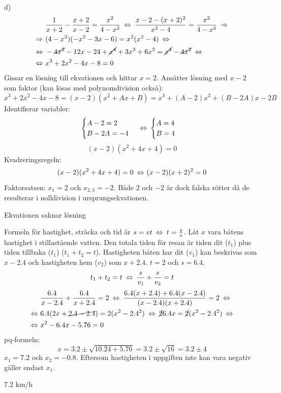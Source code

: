 \begin{task}{d)}
	\begin{align*}
	&\dfrac{1}{x+2}-\dfrac{x+2}{x-2}=\dfrac{x^2}{4-x^2}\lra
	\dfrac{x-2-(x+2)^2}{x^2-4}=\dfrac{x^2}{4-x^2} \ra \\ \ra
	&(4-x^2)(-x^2-3x-6)=x^2(x^2-4) \lra \\ \lra
	&-\cancel{4x^2}-12x-24+\cancel{x^4}+3x^3+6x^2=\cancel{x^4}-\cancel{4x^2} \lra \\ \lra
	&x^3+2x^2-4x-8=0
	\end{align*}
	Gissar en lösning till ekvationen och hittar $x=2$. Ansätter lösning med $x-2$ som faktor (kan lösas med polynomdivision också):
	\[x^3+2x^2-4x-8=(x-2)(x^2+Ax+B)=x^3+(A-2)x^2+(B-2A)x-2B\]
	Identifierar variabler:
	\[\begin{cases}
	A-2=2 \\
	B-2A=-4
	\end{cases}
	\lra
	\begin{cases}
	A=4 \\
	B=4
	\end{cases}\]
	\[(x-2)(x^2+4x+4)=0\]
	Kvadreringsregeln:
	\[(x-2)(x^2+4x+4)=0\lra
	(x-2)(x+2)^2=0\]
	Faktorsatsen: $x_1=2$ och $x_{2,3}=-2$.
	Både $2$ och $-2$ är dock falska rötter då de resulterar i nolldivision i ursprungsekvationen.
	
	\ans Ekvationen saknar lösning
\end{task}

\begin{task}{3.6}
	Formeln för hastighet, sträcka och tid är $s=v\*t \lra t=\frac{s}{v}$. Låt $x$ vara båtens hastighet i stillastående vatten. Den totala tiden för resan är tiden dit ($t_1$) plus tiden tillbaka ($t_1$) ($t_1+t_2=t$).
	Hastigheten båten har dit ($v_1$) kan beskrivas som $x-2.4$ och hastigheten hem ($v_2$) som $x+2.4$. $t=2$ och $s=6.4$.
	\[t_1+t_2=t\lra
	\frac{s}{v_1}+\frac{s}{v_2}=t\]
	\begin{align*}
	&\frac{6.4}{x-2.4}+\frac{6.4}{x+2.4} = 2 \lra
	\frac{6.4(x+2.4)+6.4(x-2.4)}{(x-2.4)(x+2.4)} = 2 \lra \\ \lra
	&6.4(2x+\cancel{2.4-2.4})=2(x^2-2.4^2) \lra
	\cancel{2}\*6.4x=\cancel{2}(x^2-2.4^2) \lra \\ \lra
	&x^2-6.4x-5.76=0
	\end{align*}
	pq-formeln:
	\[x=3.2\pm\sqrt{10.24+5.76} =3.2\pm\sqrt{16}=3.2\pm 4\]
	$x_1=7.2$ och $x_2=-0.8$. Eftersom hastigheten i uppgiften inte kan vara negativ gäller endast $x_1$.
	
	\ans $7.2$ km/h
\end{task}

